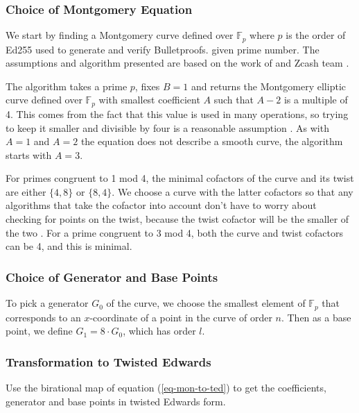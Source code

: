 \documentclass{article}
\newcommand{\Fp}{\ensuremath{\mathbb{F}_p}}
\theoremstyle{definition}
\theoremstyle{remark}
\begin{document}
	\subsubsection{Choice of Montgomery Equation}
	
	We start by finding a Montgomery curve defined over $\Fp$ where $p$ is the order of Ed255 used to generate and verify Bulletproofs. given prime number. The assumptions and algorithm presented are based on the work of \cite{generation} and Zcash team \cite{github:zkcrypto:derive}.
	
	The algorithm takes a prime $p$, fixes $B = 1$ and  returns the Montgomery elliptic curve defined over $\Fp$ with smallest coefficient $A$ such that $A-2$ is a multiple of 4. 
	This comes from the fact that this value is used in many operations, so trying to keep it smaller and divisible by four is a reasonable assumption \cite{generation}. As with $A=1$ and $A=2$ the equation does not describe a smooth curve, the algorithm starts with $A=3$.
	
	For primes congruent to 1 mod 4, the minimal cofactors of the curve and its twist are either $\{4, 8\}$ or $\{8, 4\}$.  We choose a curve with the latter cofactors so that any algorithms that take the cofactor into account don't have to worry about checking for points on the twist, because the twist cofactor will be the smaller of the two \cite{generation}. For a prime congruent to 3 mod 4, both the curve and twist cofactors can be 4, and this is minimal.  
	
	\subsubsection{Choice of Generator and Base Points}
	
	To pick a generator $G_0$ of the curve, we choose the smallest element of $\Fp$ that corresponds to an $x$-coordinate of a point in the curve of order $n$. Then as a base point, we define $G_1 = 8\cdot G_0$, which has order $l$. 
	
	\subsubsection{Transformation to Twisted Edwards}
	
	Use the birational map of equation (\ref{eq-mon-to-ted}) to get the coefficients, generator and base points in twisted Edwards form.
	
\end{document}
